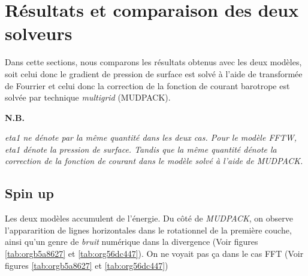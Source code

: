 \documentclass[10pt]{article}
\numberwithin{equation}{section}
\newcommand{\nb}{\textbf{N.B.}\hspace{4pt}}
\begin{document}
\section{Résultats et comparaison des deux solveurs}
\label{sec:orge02a354}
Dans cette sections, nous comparons les résultats obtenus avec les deux modèles, soit celui donc le gradient de pression de surface est solvé à l'aide de transformée de Fourrier et celui donc la correction de la fonction de courant barotrope est solvée par technique \emph{multigrid} (MUDPACK).\bigskip

\nb\begin{minipage}[t]{0.9\linewidth}
\itshape 
eta1 ne dénote par la même quantité dans les deux cas.
Pour le modèle FFTW, eta1 dénote la pression de surface.
Tandis que la même quantité dénote la correction de la fonction de courant dans le modèle solvé à l'aide de MUDPACK.   
\end{minipage}
\newpage

\subsection{Spin up}
\label{sec:org4e11f6e}
Les deux modèles accumulent de l'énergie.
Du côté de \emph{MUDPACK}, on observe l'appararition de lignes horizontales dans le rotationnel de la première couche, ainsi qu'un genre de \emph{bruit} numérique dans la divergence (Voir figures \ref{tab:orgb5a8627} et \ref{tab:org56dc447}).
On ne voyait pas ça dans le cas FFT (Voir figures \ref{tab:orgb5a8627} et \ref{tab:org56dc447})
\end{document}
